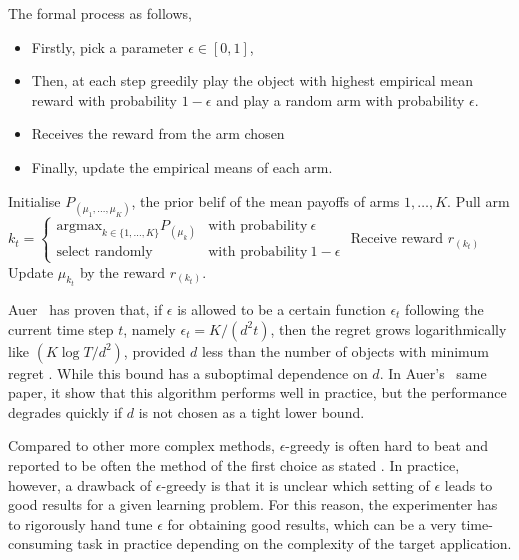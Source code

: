 The formal process as follows,
\begin{itemize}
\item Firstly, pick a parameter $\epsilon \in [0,1]$, 
\item Then, at each step greedily play the object with highest empirical mean reward with probability $1-\epsilon$ and play a random arm with probability $\epsilon$. 
\item Receives the reward from the arm chosen
\item Finally, update the empirical means of each arm.
\end{itemize}

\begin{algo}
\label{algo:epsilon}
\begin{algorithmic}
\STATE {\ }
\STATE Initialise $P_{(\mu_1,\dots,\mu_K)}$, the prior belif of the mean payoffs of arms $1,\dots,K$. 
	\STATE Pull arm $k_t = \begin{cases}
    \text{argmax}_{k\in \{1,\dots,K\}} P_{(\mu_k)} & \text{with probability}\ \epsilon \\
    \text{select randomly} & \text{with probability}\ 1-\epsilon
    \end{cases}$ 
    \STATE Receive reward $r_{(k_t)}$
	\STATE Update $\mu_{k_t}$ by the reward $r_{(k_t)}$.
\ENDFOR
\end{algorithmic}
\end{algo}

Auer~\cite{Auer02Finite} has proven that, if $\epsilon$ is allowed to be a certain function $\epsilon_t$ following the current time step $t$, namely $\epsilon_t = K/(d^2t)$, then the regret grows logarithmically like $(K \log{T}/d^2)$, provided $d$ less than the number of objects with minimum regret . While this bound has a suboptimal dependence on $d$. In Auer's~\cite{Auer02Finite} same paper, it show that this algorithm performs well in practice, but the performance degrades quickly if $d$ is not chosen as a tight lower bound.

Compared to other more complex methods, $\epsilon$-greedy is often hard to beat and reported to be often the method of the first choice as stated . In practice, however, a drawback of $\epsilon$-greedy is that it is unclear which setting of $\epsilon$ leads to good results for a given learning problem. For this reason, the experimenter has to rigorously hand tune $\epsilon$ for obtaining good results, which can be a very time-consuming task in practice depending on the complexity of the target application.

